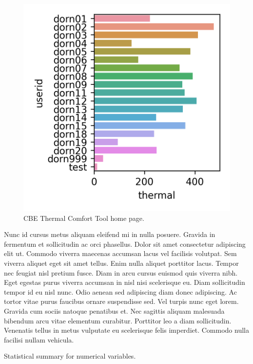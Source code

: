 \begin{figure}[]
    \centering
    \includegraphics{figures/bar-plot.png}
    \caption{CBE Thermal Comfort Tool home page.}
    \label{fig:cbe_ashrae}
\end{figure}

Nunc id cursus metus aliquam eleifend mi in nulla posuere. Gravida in fermentum et sollicitudin ac orci phasellus. Dolor sit amet consectetur adipiscing elit ut. Commodo viverra maecenas accumsan lacus vel facilisis volutpat. Sem viverra aliquet eget sit amet tellus. Enim nulla aliquet porttitor lacus. Tempor nec feugiat nisl pretium fusce. Diam in arcu cursus euismod quis viverra nibh. Eget egestas purus viverra accumsan in nisl nisi scelerisque eu. Diam sollicitudin tempor id eu nisl nunc. Odio aenean sed adipiscing diam donec adipiscing. Ac tortor vitae purus faucibus ornare suspendisse sed. Vel turpis nunc eget lorem. Gravida cum sociis natoque penatibus et. Nec sagittis aliquam malesuada bibendum arcu vitae elementum curabitur. Porttitor leo a diam sollicitudin. Venenatis tellus in metus vulputate eu scelerisque felis imperdiet. Commodo nulla facilisi nullam vehicula.

\begin{center}

	\begin{table}[!t]
	\caption{Statistical summary for numerical variables.
	{\label{tab:stats_num_data}}}
	
	\end{table}
\end{center}


